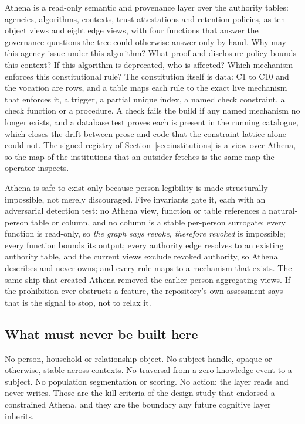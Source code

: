 Athena is a read-only semantic and provenance layer over the authority tables: agencies,
algorithms, contexts, trust attestations and retention policies, as ten object views and eight edge
views, with four functions that answer the governance questions the tree could otherwise answer only
by hand. Why may this agency issue under this algorithm? What proof and disclosure policy bounds
this context? If this algorithm is deprecated, who is affected? Which mechanism enforces this
constitutional rule? The constitution itself is data: C1 to C10 and the vocation are rows, and a
table maps each rule to the exact live mechanism that enforces it, a trigger, a partial unique index,
a named check constraint, a check function or a procedure. A check fails the build if any named
mechanism no longer exists, and a database test proves each is present in the running catalogue,
which closes the drift between prose and code that the constraint lattice alone could not. The
signed registry of Section~\ref{sec:institutions} is a view over Athena, so the map of the
institutions that an outsider fetches is the same map the operator inspects. \sImpl

Athena is safe to exist only because person-legibility is made structurally impossible, not merely
discouraged. Five invariants gate it, each with an adversarial detection test: no Athena view,
function or table references a natural-person table or column, and no column is a stable per-person
surrogate; every function is read-only, so \emph{the graph says revoke, therefore revoked} is
impossible; every function bounds its output; every authority edge resolves to an existing authority
table, and the current views exclude revoked authority, so Athena describes and never owns; and every
rule maps to a mechanism that exists. The same ship that created Athena removed the earlier
person-aggregating views. If the prohibition ever obstructs a feature, the repository's own
assessment says that is the signal to stop, not to relax it. \sImpl

\subsection{What must never be built here}

No person, household or relationship object. No subject handle, opaque or otherwise, stable across
contexts. No traversal from a zero-knowledge event to a subject. No population segmentation or
scoring. No action: the layer reads and never writes. Those are the kill criteria of the design
study that endorsed a constrained Athena, and they are the boundary any future cognitive layer
inherits.

